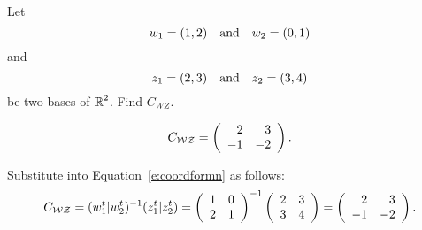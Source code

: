\documentclass{ximera}
\begin{document}
\begin{exercise} \label{c7.1.2}
Let
\[
w_1 = (1,2) \quad\mbox{and}\quad w_2 = (0,1)
\]
and
\[
z_1 = (2,3) \quad\mbox{and}\quad z_2 = (3,4)
\]
be two bases of $\mbox{$\Bbb{R}$}^2$.  Find $C_{WZ}$.

\begin{solution}

\ans
\[ C_{\cal WZ} = \left(\begin{array}{rr} 2 & 3\\ -1 &-2\end{array}\right). \]

\soln Substitute into Equation~\eqref{e:coordformn} as follows:
\[ C_{\cal WZ} = (w_1^t|w_2^t)^{-1}(z_1^t|z_2^t) =
\left(\begin{array}{rr} 1 & 0\\ 2 &1\end{array}\right)^{-1}\left(\begin{array}{rr} 2 & 3\\ 3 &4\end{array}\right) =
\left(\begin{array}{rr} 2 & 3\\ -1 &-2\end{array}\right). \]

\end{solution}
\end{exercise}
\end{document}
